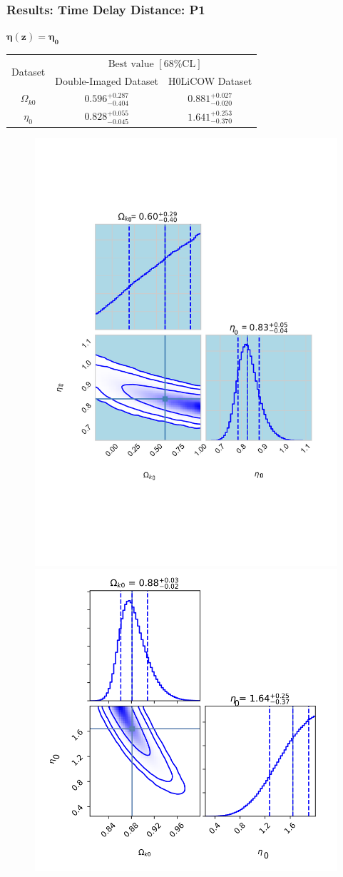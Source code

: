 \documentclass[xcolor=table,bigger]{beamer}
\begin{document}
\begin{frame}
 \frametitle{Results: Time Delay Distance: P1}
\begin{small}
 
 $
{\boxed{\boldsymbol{\eta(z)=\eta_0}}}
$ 
\begin{table}
  \begin{tabular}{|c|c|c|}
    \hline
    \multirow{2}{*}{Dataset} &
      \multicolumn{2}{c|}{${\text { Best value }[68 \% \mathrm{CL}]}$} \\
\cline{2-3}
    &Double-Imaged Dataset & H0LiCOW Dataset \\
    \hline
    $\Omega_{k0}$ & $ {0.596_{-0.404}^{+0.287}}$ & $0.881^{+0.027}_{-0.020}$ \\
    \hline
    $ \eta_0$ &${0.828_{-0.045}^{+0.055}}$ &$1.641^{+0.253}_{-0.370}$  \\
       \hline
  \end{tabular}
\end{table}
\end{small}

 \begin{figure}[ht!]
\centering
\includegraphics[width=45 mm]{rrrr}
\includegraphics[width=50 mm]{H0LiCOW_P1}
\end{figure} 
\end{frame}
\end{document}
